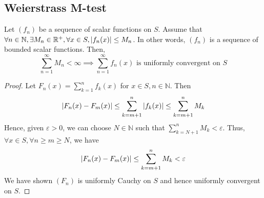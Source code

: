 \subsection{Weierstrass M-test}
\begin{theorem}
	Let \( (f_n) \) be a sequence of scalar functions on \( S \).
	Assume that \( \forall n \in \mathbb N, \exists M_n \in \mathbb R^+, \forall x \in S, \abs{f_n(x)} \leq M_n \).
	In other words, \( (f_n) \) is a sequence of bounded scalar functions.
	Then,
	\[
		\sum_{n = 1}^\infty M_n < \infty \implies \sum_{n=1}^\infty f_n(x) \text{ is uniformly convergent on } S
	\]
\end{theorem}
\begin{proof}
	Let \( F_n(x) = \sum_{k=1}^n f_k(x) \) for \( x \in S, n \in \mathbb N \).
	Then
	\[
		\abs{F_n(x) - F_m(x)} \leq \sum_{k=m+1}^n \abs{f_k(x)} \leq \sum_{k=m+1}^n M_k
	\]
	Hence, given \( \varepsilon > 0 \), we can choose \( N \in \mathbb N \) such that \( \sum_{k=N+1}^n M_k < \varepsilon \).
	Thus, \( \forall x \in S, \forall n \geq m \geq N \), we have
	\[
		\abs{F_n(x) - F_m(x)} \leq \sum_{k=m+1}^n M_k < \varepsilon
	\]
	We have shown \( (F_n) \) is uniformly Cauchy on \( S \) and hence uniformly convergent on \( S \).
\end{proof}

